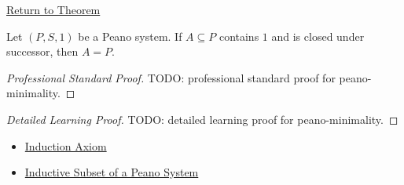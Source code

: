 \newpage
{}
\label{prf:peano-minimality}

\begin{remark*}[Return]
\hyperref[thm:peano-minimality]{Return to Theorem}
\end{remark*}

\begin{theorem*}
Let $(P,S,1)$ be a Peano system. If $A\subseteq P$ contains $1$ and is closed
under successor, then $A=P$.
\end{theorem*}

\begin{proof}[Professional Standard Proof]
\LRAProofBodyStart
TODO: professional standard proof for peano-minimality.
\end{proof}

\begin{proof}[Detailed Learning Proof]
\LRAProofBodyStart
TODO: detailed learning proof for peano-minimality.
\end{proof}

\begin{remark*}
\end{remark*}

\begin{dependencies}
\begin{itemize}
  \item \hyperref[ax:peano-induction]{Induction Axiom}
  \item \hyperref[def:inductive-subset-of-peano-system]{Inductive Subset of a Peano System}
\end{itemize}
\end{dependencies}

\clearpage
